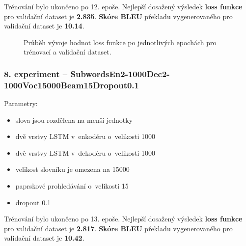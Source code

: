 Trénování bylo ukončeno po 12. epoše. Nejlepší dosažený výsledek \textbf{loss funkce} pro validační dataset je \textbf{2.835}. \textbf{Skóre BLEU} překladu vygenerovaného pro validační dataset je \textbf{10.14}.

\begin{figure}[H]
    \begin{center}
    \end{center}
	\caption{Průběh vývoje hodnot loss funkce po jednotlivých epochách pro trénovací a validační dataset.}
\end{figure}


\subsubsection{8. experiment -- SubwordsEn2-1000Dec2-1000Voc15000Beam15Dropout0.1}\label{experiment8}
Parametry:
\begin{itemize}
  \item slova jsou rozdělena na menší jednotky
  \item dvě vrstvy LSTM v~enkodéru o~velikosti 1000
  \item dvě vrstvy LSTM v~dekodéru o~velikosti 1000
  \item velikost slovníku je omezena na 15000
  \item paprskové prohledávání o~velikosti 15
  \item dropout 0.1
\end{itemize}

Trénování bylo ukončeno po 13. epoše. Nejlepší dosažený výsledek \textbf{loss funkce} pro validační dataset je \textbf{2.817}. \textbf{Skóre BLEU} překladu vygenerovaného pro validační dataset je \textbf{10.42}.

